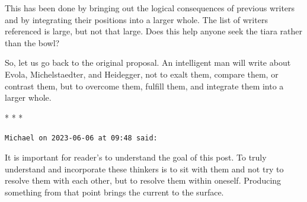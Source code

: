 This has been done by bringing out the logical consequences of previous writers and by integrating their positions into a larger whole. The list of writers referenced is large, but not that large. Does this help anyone seek the tiara rather than the bowl?

So, let us go back to the original proposal. An intelligent man will write about Evola, Michelstaedter, and Heidegger, not to exalt them, compare them, or contrast them, but to overcome them, fulfill them, and integrate them into a larger whole.



\begin{center}* * *\end{center}

\begin{footnotesize}
\begin{sffamily}
\texttt{Michael on 2023-06-06 at 09:48 said:}

It is important for reader's to understand the goal of this post. To truly understand and incorporate these thinkers is to sit with them and not try to resolve them with each other, but to resolve them within oneself. Producing something from that point brings the current to the surface.

\end{sffamily}
\end{footnotesize}

